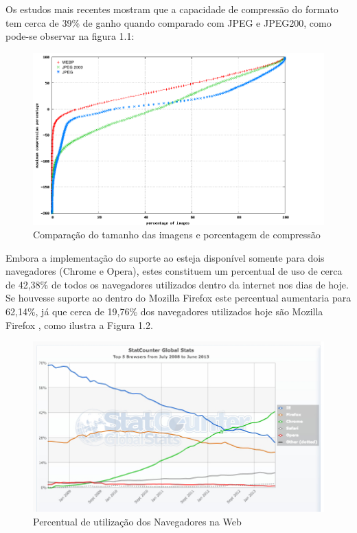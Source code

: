 \documentclass[espaco=simples,appendix=Name]{abnt}
\begin{document}
Os estudos mais recentes mostram que a capacidade de compressão do formato  tem cerca de 39\% de ganho quando comparado com JPEG e JPEG200, como pode-se observar na figura 1.1:

\begin{figure}[h]
  \centering
    \includegraphics[scale=0.4]{Plot3_cdfcompr.png}
  \caption{Comparação do tamanho das imagens e porcentagem de compressão \protect\cite{WebPStudy}}
\end{figure}

Embora a implementação do suporte ao  esteja disponível somente para dois navegadores (Chrome e Opera), estes constituem um percentual de uso de cerca de 42,38\% de todos os navegadores utilizados dentro da internet nos dias de hoje. Se houvesse suporte ao  dentro do Mozilla Firefox este percentual aumentaria para 62,14\%, já que cerca de 19,76\% dos navegadores utilizados hoje são Mozilla Firefox \protect\cite{BrowserStats}, como ilustra a Figura 1.2.

\begin{figure}[h]
  \centering
    \includegraphics[scale=0.5]{BrowserCounter_2013.png}
  \caption{Percentual de utilização dos Navegadores na Web \cite{BrowserStats}}
\end{figure}
\end{document}
